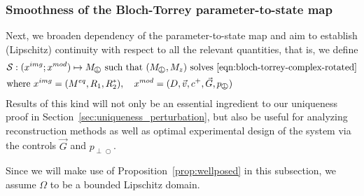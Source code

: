 \documentclass{ws-m3as}
\def\Mpp{M_{\perp\!\!\!\!\!\bigcirc}}
\def\pp{p_{\perp\!\!\!\!\!\bigcirc}}
\begin{document}
\subsubsection{Smoothness of the Bloch-Torrey parameter-to-state map}\label{subsec:S}

Next, we broaden dependency of the parameter-to-state map and aim to establish (Lipschitz) continuity with respect to all the relevant quantities, that is, we define
\begin{equation}\label{S_gen}
\begin{aligned}
&\mathcal{S}:(x^{img};x^{mod})\mapsto \Mpp \text{ such that $(\Mpp,M_z)$ solves \eqref{eqn:bloch-torrey-complex-rotated}} \\  
&\text{where }x^{img}=(M^{eq},R_1,R_2^*), \quad x^{mod}=(D,\vec v,c^+,\vec G,\pp)
\end{aligned}
\end{equation}
Results of this kind will not only be an essential ingredient to our uniqueness proof in Section~\ref{sec:uniqueness_perturbation}, but also be useful for analyzing reconstruction methods as well as optimal experimental design of the system via the controls $\vec G$ and $\pp$. 

Since we will make use of Proposition~\ref{prop:wellposed} in this subsection, we assume $\Omega$ to be a bounded Lipschitz domain.
\end{document}
